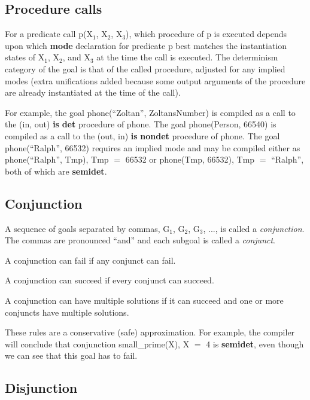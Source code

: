 \documentclass[a4paper,11pt,notitlepage,onecolumn]{book}
\begin{document}
\subsection*{Procedure calls}

For a predicate call \textsf{p(X$_{1}$, X$_{2}$, X$_{3}$)}, which procedure of \textsf{p} is executed
depends upon which \textsf{\textbf{mode}} declaration for predicate \textsf{p} best matches the
instantiation states of \textsf{X$_{1}$}, \textsf{X$_{2}$}, and \textsf{X$_{3}$} at the time the call is
executed.  The determinism category of the goal is that of the called
procedure, adjusted for any implied modes (\ie extra unifications added
because some output arguments of the procedure are already instantiated at
the time of the call).

For example, the goal \textsf{phone(``Zoltan'', ZoltansNumber)} is compiled as a call
to the \textsf{(in, out) \textbf{is} \textbf{det}} procedure of \textsf{phone}.  The goal
\textsf{phone(Person, 66540)} is compiled as a call to the \textsf{(out, in) \textbf{is} \textbf{nondet}}
procedure of \textsf{phone}.  The goal \textsf{phone(``Ralph'', 66532)} requires an implied
mode and may be compiled either as \textsf{phone(``Ralph'', Tmp), Tmp {\ensuremath{=}} 66532} or
\textsf{phone(Tmp, 66532), Tmp {\ensuremath{=}} ``Ralph''}, both of which are \textsf{\textbf{semidet}}.

\subsection*{Conjunction}

A sequence of goals separated by commas, \textsf{G$_{1}$, G$_{2}$, G$_{3}$, ...}, is called a
\emph{conjunction}.  The commas are pronounced ``and'' and each subgoal is
called a \emph{conjunct}.

A conjunction can fail if any conjunct can fail.

A conjunction can succeed if every conjunct can succeed.

A conjunction can have multiple solutions if it can succeed
and one or more conjuncts have multiple solutions.

\Note These rules are a conservative (\ie safe) approximation.  For example,
the compiler will conclude that conjunction \textsf{small\_prime(X), X {\ensuremath{=}} 4} is
\textsf{\textbf{semidet}}, even though we can see that this goal has to fail.

\subsection*{Disjunction}
\end{document}
